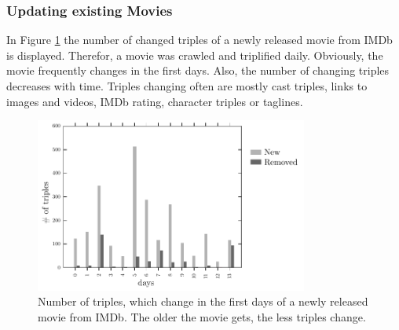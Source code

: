 \subsubsection{Updating existing Movies}
In Figure \ref{fig_new_movie} the number of changed triples of a newly released movie from IMDb is displayed.
Therefor, a movie was crawled and triplified daily.
Obviously, the movie frequently changes in the first days.
Also, the number of changing triples decreases with time.
Triples changing often are mostly cast triples, links to images and videos, IMDb rating, character triples or taglines.

\begin{figure}[h!]
  \begin{center}
  \includegraphics[width=0.8\textwidth]{images/updating_2.pdf}
  \end{center}
  \caption{Number of triples, which change in the first days of a newly released movie from IMDb. The older the movie gets, the less triples change.}
  \label{fig_new_movie}
\end{figure}

